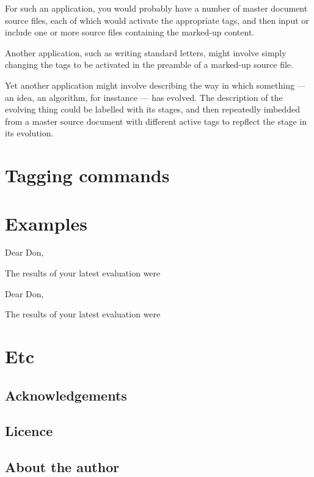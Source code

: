 \documentclass[a4paper,12pt,twoside]{memoir}
\begin{document}
For such an application, you would probably have
a number of master document source files,
each of which would activate the appropriate tags,
and then input or include one or more source files
containing the marked-up content.

Another application, such as writing standard letters,
might involve simply changing the tags to be activated
in the preamble of a marked-up source file.

Yet another application might involve describing the way
in which something --- an idea, an algorithm, for insstance --- has evolved.
The description of the evolving thing could be labelled with its stages,
and then repeatedly imbedded from a master source document with different
active tags to repflect the stage in its evolution. 
\chapter{Tagging commands}
\chapter{Examples}
\begin{LTXexample}[pos=b]

Dear Don,

The results of your latest evaluation were

\end{LTXexample}

\begin{LTXexample}[pos=b]

Dear Don,

The results of your latest evaluation were

\end{LTXexample}
\chapter{Etc}
\section{Acknowledgements}
\section{Licence}
\section{About the author}
\end{document}
